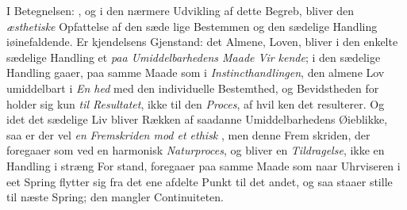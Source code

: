 I Betegnelsen: , og i den nærmere Udvikling af
dette Begreb, bliver den \emph{æsthetiske} Opfattelse af den sæde\-%
lige Bestemmen og den sædelige Handling iøinefaldende. Er\-%
kjendelsens Gjenstand: det Almene, Loven, bliver i den enkelte
sædelige Handling et \emph{paa Umiddelbarhedens Maade Vir\-%
kende}; i den sædelige Handling gaaer, paa samme Maade som
i \emph{Instincthandlingen}, den almene Lov umiddelbart i \emph{En\-%
hed} med den individuelle Bestemthed, og Bevidstheden for\-%
holder sig kun \emph{til Resultatet}, ikke til den \emph{Proces}, af hvil\-%
ken det resulterer. Og idet det sædelige Liv bliver Rækken
af saadanne Umiddelbarhedens Øieblikke, saa er der vel \emph{en}
\emph{Fremskriden mod et ethisk} \emph{}, men denne Frem\-%
skriden, der foregaaer som ved en harmonisk \emph{Naturproces},
og bliver en \emph{Tildragelse}, ikke en Handling i stræng For\-%
stand, foregaaer paa samme Maade som naar Uhrviseren i eet
Spring flytter sig fra det ene afdelte Punkt til det andet, og
saa staaer stille til næste Spring; den mangler Continuiteten.

